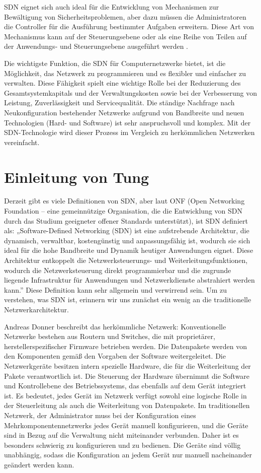 \documentclass[fontsize=12pt,paper=a4,open=any,parskip=half,
  twoside=false,toc=listof,toc=bibliography,fleqn,leqno,
  captions=nooneline,captions=tableabove,british]{scrbook}
\begin{document}
SDN eignet sich auch ideal für die Entwicklung von Mechanismen zur Bewältigung von Sicherheitsproblemen, aber dazu müssen die Administratoren die Controller für die Ausführung bestimmter Aufgaben erweitern. Diese Art von Mechanismus kann auf der Steuerungsebene oder als eine Reihe von Teilen auf der Anwendungs- und Steuerungsebene ausgeführt werden \cite{morales2015extending}.\par
Die wichtigste Funktion, die SDN für Computernetzwerke bietet, ist die Möglichkeit, das Netzwerk zu programmieren und es flexibler und einfacher zu verwalten. Diese Fähigkeit spielt eine wichtige Rolle bei der Reduzierung des Gesamtsystemkapitals und der Verwaltungskosten sowie bei der Verbesserung von Leistung, Zuverlässigkeit und Servicequalität. Die ständige Nachfrage nach Neukonfiguration bestehender Netzwerke aufgrund von Bandbreite und neuen Technologien (Hard- und Software) ist sehr anspruchsvoll und komplex. Mit der SDN-Technologie wird dieser Prozess im Vergleich zu herkömmlichen Netzwerken vereinfacht\cite{hasan2020sdn}.

\newpage
\section*{Einleitung von Tung}\label{einl-tung}
Derzeit gibt es viele Definitionen von SDN, aber laut ONF (Open Networking Foundation – eine gemeinnützige Organisation, die die Entwicklung von SDN durch das Studium geeigneter offener Standards unterstützt), ist SDN definiert als: „Software-Defined Networking (SDN) ist eine aufstrebende Architektur, die dynamisch, verwaltbar, kostengünstig und anpassungsfähig ist, wodurch sie sich ideal für die hohe Bandbreite und Dynamik heutiger Anwendungen eignet. Diese Architektur entkoppelt die Netzwerksteuerungs- und Weiterleitungsfunktionen, wodurch die Netzwerksteuerung direkt programmierbar und die zugrunde liegende Infrastruktur für Anwendungen und Netzwerkdienste abstrahiert werden kann.”\cite{ONFTung} Diese Definition kann sehr allgemein und verwirrend sein. Um zu verstehen, was SDN ist, erinnern wir uns zunächst ein wenig an die traditionelle Netzwerkarchitektur.


Andreas Donner beschreibt das herkömmliche Netzwerk: 
Konventionelle Netzwerke bestehen aus Routern und Switches, die mit proprietärer, herstellerspezifischer      Firmware betrieben werden. Die Datenpakete werden von den Komponenten gemäß den Vorgaben der Software weitergeleitet. Die Netzwerkgeräte besitzen intern spezielle Hardware, die für die Weiterleitung der Pakete verantwortlich ist. Die Steuerung der Hardware übernimmt die Software und Kontrollebene des Betriebssystems, das ebenfalls auf dem Gerät integriert ist. \cite{tranetworkTung}
Es bedeutet, jedes Gerät im Netzwerk verfügt sowohl eine logische Rolle in der Steuerleitung als auch die Weiterleitung von Datenpakete. Im traditionellen Netzwerk, der Administrator muss bei der Konfiguration eines Mehrkomponentennetzwerks jedes Gerät manuell konfigurieren, und die Geräte sind in Bezug auf die Verwaltung nicht miteinander verbunden. Daher ist es besonders schwierig zu konfigurieren und zu bedienen. Die Geräte sind völlig unabhängig, sodass die Konfiguration an jedem Gerät nur manuell nacheinander geändert werden kann.
\end{document}
